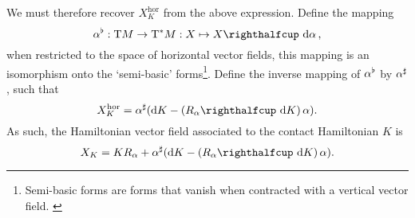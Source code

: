 We must therefore recover \(X^\text{hor}_K\) from the above expression. Define the mapping  
\begin{equation}
     \toDual{\alpha}: \tbundle{M} \to \ctbundle{M}: X \mapsto  \intpr{X}{\dd{\alpha}},
\end{equation}
when restricted to the space of horizontal vector fields, this mapping is an isomorphism onto the `semi-basic' forms\footnote{Semi-basic forms are forms that vanish when contracted with a vertical vector field. \cite{Libermann1987}}. Define the inverse mapping of \(\alpha^\flat\) by \(\alpha^\sharp\), such that
\begin{equation}
     X_K^\text{hor} = \fromDual{\alpha}\qty(\dd{K} - \qty(\intpr{R_\alpha}{\dd{K}})\,\alpha).
\end{equation}
As such, the Hamiltonian vector field associated to the contact Hamiltonian \(K\) is
\begin{equation}
    X_K = K R_\alpha + \fromDual{\alpha}(\dd{K} - \qty(\intpr{R_\alpha}{\dd{K}})\,\alpha).
    \label{eq:contact_ham_vf_cofree}
\end{equation}


